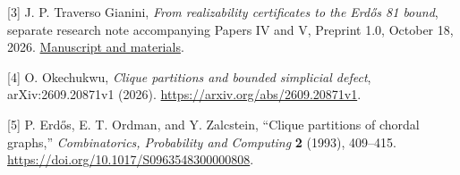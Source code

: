 \documentclass[english,11pt,a4paper]{article}
\begin{document}
{[}3{]} J. P. Traverso Gianini, \emph{From realizability certificates to
the Erdős 81 bound}, separate research note accompanying Papers IV and
V, Preprint 1.0, October 18, 2026.
\href{https://github.com/jtraverso/erdos-81-chordal-clique-partitions/tree/main/series_notes/NOTE_I_ERDOS81_TRANSFER}{Manuscript
and materials}.

{[}4{]} O. Okechukwu, \emph{Clique partitions and bounded simplicial
defect}, arXiv:2609.20871v1 (2026).
\url{https://arxiv.org/abs/2609.20871v1}.

{[}5{]} P. Erdős, E. T. Ordman, and Y. Zalcstein, ``Clique partitions of
chordal graphs,'' \emph{Combinatorics, Probability and Computing}
\textbf{2} (1993), 409--415.
\url{https://doi.org/10.1017/S0963548300000808}.
\end{document}
